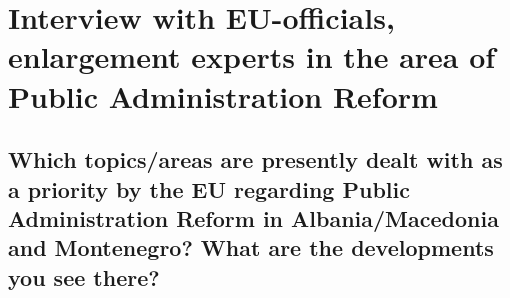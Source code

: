 
\chapter[Interviews with EU-officials, enlargement experts]{Interview with EU-officials, enlargement experts in the area of Public Administration Reform}
\label{anhang:InterviewEuOfficials}
\section{Which topics/areas are presently dealt with as a priority by the EU regarding Public Administration Reform in Albania/Macedonia and Montenegro? What are the developments you see there? }
\label{sec:there}

